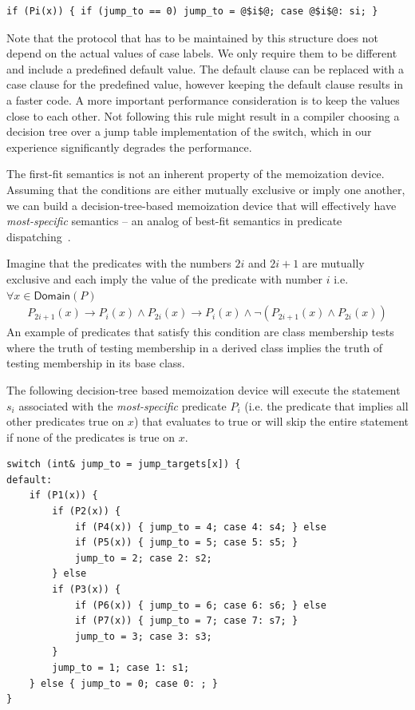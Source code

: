 \begin{lstlisting}
if (Pi(x)) { if (jump_to == 0) jump_to = @$i$@; case @$i$@: si; }
\end{lstlisting}

\noindent
Note that the protocol that has to be maintained by this structure does not 
depend on the actual values of case labels. We only require them to be 
different and include a predefined default value. The default clause can be 
replaced with a case clause for the predefined value, however keeping the default  
clause results in a faster code. A more important performance consideration is to 
keep the values close to each other. Not following this rule might result in a 
compiler choosing a decision tree over a jump table implementation of the 
switch, which in our experience significantly degrades the performance.

The first-fit semantics is not an inherent property of the memoization device. 
Assuming that the conditions are either mutually exclusive or imply one another, we 
can build a decision-tree-based memoization device that will effectively have 
\emph{most-specific} semantics -- an analog of best-fit semantics in predicate 
dispatching~\cite{ErnstKC98}.

Imagine that the predicates with the numbers $2i$ and $2i+1$ are mutually exclusive and 
each imply the value of the predicate with number $i$ i.e. $\forall x \in \mathsf{Domain}(P)$
\begin{eqnarray*}
P_{2i+1}(x)\rightarrow P_i(x) \wedge P_{2i}(x)\rightarrow P_i(x) \wedge \neg(P_{2i+1}(x) \wedge P_{2i}(x))
\end{eqnarray*}
\noindent
An example of predicates that satisfy this condition are class membership tests 
where the truth of testing membership in a derived class implies the truth of 
testing membership in its base class. 

The following decision-tree based memoization device will execute the statement 
$s_i$ associated with the \emph{most-specific} predicate $P_i$ (i.e. the 
predicate that implies all other predicates true on $x$) that evaluates to true 
or will skip the entire statement if none of the predicates is true on $x$.

\begin{lstlisting}
switch (int& jump_to = jump_targets[x]) {
default:
    if (P1(x)) {
        if (P2(x)) {
            if (P4(x)) { jump_to = 4; case 4: s4; } else
            if (P5(x)) { jump_to = 5; case 5: s5; } 
            jump_to = 2; case 2: s2;
        } else
        if (P3(x)) {
            if (P6(x)) { jump_to = 6; case 6: s6; } else
            if (P7(x)) { jump_to = 7; case 7: s7; } 
            jump_to = 3; case 3: s3;
        }
        jump_to = 1; case 1: s1;
    } else { jump_to = 0; case 0: ; }
}
\end{lstlisting}


